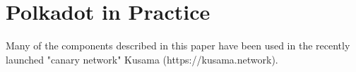 \section{Polkadot in Practice}
Many of the components described in this paper have been used in the recently launched "canary network" Kusama (https://kusama.network).
